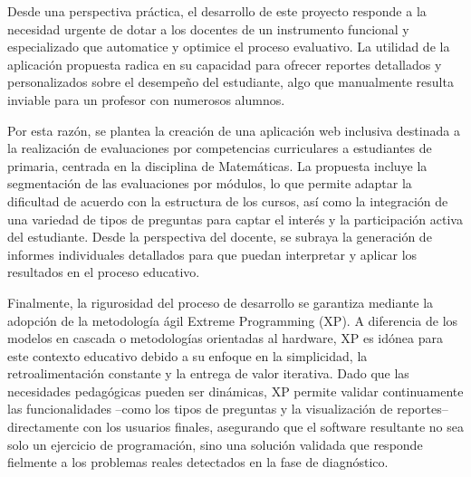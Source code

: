 Desde una perspectiva práctica, el desarrollo de este proyecto responde a la necesidad urgente de dotar a los docentes de un instrumento funcional y especializado que automatice y optimice el proceso evaluativo. La utilidad de la aplicación propuesta radica en su capacidad para ofrecer reportes detallados y personalizados sobre el desempeño del estudiante, algo que manualmente resulta inviable para un profesor con numerosos alumnos.

Por esta razón, se plantea la creación de una aplicación web inclusiva destinada a la realización de evaluaciones por competencias curriculares a estudiantes de primaria, centrada en la disciplina de Matemáticas. La propuesta incluye la segmentación de las evaluaciones por módulos, lo que permite adaptar la dificultad de acuerdo con la estructura de los cursos, así como la integración de una variedad de tipos de preguntas para captar el interés y la participación activa del estudiante. Desde la perspectiva del docente, se subraya la generación de informes individuales detallados para que puedan interpretar y aplicar los resultados en el proceso educativo.

Finalmente, la rigurosidad del proceso de desarrollo se garantiza mediante la adopción de la metodología ágil Extreme Programming (XP). A diferencia de los modelos en cascada o metodologías orientadas al hardware, XP es idónea para este contexto educativo debido a su enfoque en la simplicidad, la retroalimentación constante y la entrega de valor iterativa. Dado que las necesidades pedagógicas pueden ser dinámicas, XP permite validar continuamente las funcionalidades --como los tipos de preguntas y la visualización de reportes-- directamente con los usuarios finales, asegurando que el software resultante no sea solo un ejercicio de programación, sino una solución validada que responde fielmente a los problemas reales detectados en la fase de diagnóstico.
